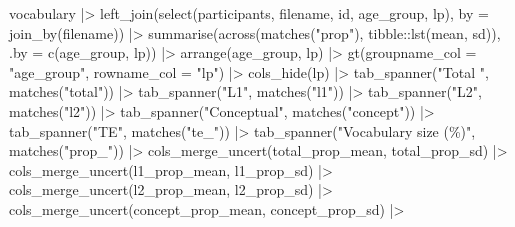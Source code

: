 \documentclass[
  letterpaper,
  DIV=11,
  numbers=noendperiod]{scrartcl}
\newenvironment{Shaded}{\begin{snugshade}}{\end{snugshade}}
\newcommand{\AttributeTok}[1]{\textcolor[rgb]{0.40,0.45,0.13}{#1}}
\newcommand{\FunctionTok}[1]{\textcolor[rgb]{0.28,0.35,0.67}{#1}}
\newcommand{\NormalTok}[1]{\textcolor[rgb]{0.00,0.23,0.31}{#1}}
\newcommand{\SpecialCharTok}[1]{\textcolor[rgb]{0.37,0.37,0.37}{#1}}
\newcommand{\StringTok}[1]{\textcolor[rgb]{0.13,0.47,0.30}{#1}}
\begin{document}
\begin{Shaded}
\begin{Highlighting}[]
\NormalTok{vocabulary }\SpecialCharTok{|\textgreater{}} 
    \FunctionTok{left\_join}\NormalTok{(}\FunctionTok{select}\NormalTok{(participants, filename, id, age\_group, lp),}
              \AttributeTok{by =} \FunctionTok{join\_by}\NormalTok{(filename)) }\SpecialCharTok{|\textgreater{}} 
    \FunctionTok{summarise}\NormalTok{(}\FunctionTok{across}\NormalTok{(}\FunctionTok{matches}\NormalTok{(}\StringTok{"prop"}\NormalTok{), }
\NormalTok{                     tibble}\SpecialCharTok{::}\FunctionTok{lst}\NormalTok{(mean, sd)),}
              \AttributeTok{.by =} \FunctionTok{c}\NormalTok{(age\_group, lp)) }\SpecialCharTok{|\textgreater{}}
    \FunctionTok{arrange}\NormalTok{(age\_group, lp) }\SpecialCharTok{|\textgreater{}} 
    \FunctionTok{gt}\NormalTok{(}\AttributeTok{groupname\_col =} \StringTok{"age\_group"}\NormalTok{,}
       \AttributeTok{rowname\_col =} \StringTok{"lp"}\NormalTok{) }\SpecialCharTok{|\textgreater{}} 
    \FunctionTok{cols\_hide}\NormalTok{(lp) }\SpecialCharTok{|\textgreater{}} 
    \FunctionTok{tab\_spanner}\NormalTok{(}\StringTok{"Total "}\NormalTok{, }\FunctionTok{matches}\NormalTok{(}\StringTok{"total"}\NormalTok{)) }\SpecialCharTok{|\textgreater{}} 
    \FunctionTok{tab\_spanner}\NormalTok{(}\StringTok{"L1"}\NormalTok{, }\FunctionTok{matches}\NormalTok{(}\StringTok{"l1"}\NormalTok{)) }\SpecialCharTok{|\textgreater{}} 
    \FunctionTok{tab\_spanner}\NormalTok{(}\StringTok{"L2"}\NormalTok{, }\FunctionTok{matches}\NormalTok{(}\StringTok{"l2"}\NormalTok{)) }\SpecialCharTok{|\textgreater{}} 
    \FunctionTok{tab\_spanner}\NormalTok{(}\StringTok{"Conceptual"}\NormalTok{, }\FunctionTok{matches}\NormalTok{(}\StringTok{"concept"}\NormalTok{)) }\SpecialCharTok{|\textgreater{}} 
    \FunctionTok{tab\_spanner}\NormalTok{(}\StringTok{"TE"}\NormalTok{, }\FunctionTok{matches}\NormalTok{(}\StringTok{"te\_"}\NormalTok{)) }\SpecialCharTok{|\textgreater{}} 
    \FunctionTok{tab\_spanner}\NormalTok{(}\StringTok{"Vocabulary size (\%)"}\NormalTok{, }\FunctionTok{matches}\NormalTok{(}\StringTok{"prop\_"}\NormalTok{)) }\SpecialCharTok{|\textgreater{}} 
    \FunctionTok{cols\_merge\_uncert}\NormalTok{(total\_prop\_mean, total\_prop\_sd) }\SpecialCharTok{|\textgreater{}} 
    \FunctionTok{cols\_merge\_uncert}\NormalTok{(l1\_prop\_mean, l1\_prop\_sd) }\SpecialCharTok{|\textgreater{}} 
    \FunctionTok{cols\_merge\_uncert}\NormalTok{(l2\_prop\_mean, l2\_prop\_sd) }\SpecialCharTok{|\textgreater{}} 
    \FunctionTok{cols\_merge\_uncert}\NormalTok{(concept\_prop\_mean, concept\_prop\_sd) }\SpecialCharTok{|\textgreater{}} 

\end{Highlighting}
\end{Shaded}
\end{document}
